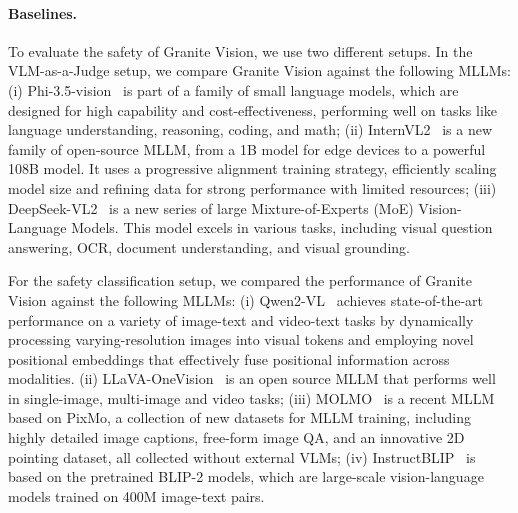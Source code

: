 \paragraph{Baselines.} To evaluate the safety of Granite Vision, we use two different setups. In the VLM-as-a-Judge setup, we compare Granite Vision against the following MLLMs: (i) Phi-3.5-vision~\citep{abdin2024phi} is part of a family of small language models, which are designed for high capability and cost-effectiveness, performing well on tasks like language understanding, reasoning, coding, and math; (ii) InternVL2~\citep{chen2024internvl} is a new family of open-source MLLM, from a 1B model for edge devices to a powerful 108B model. It uses a progressive alignment training strategy, efficiently scaling model size and refining data for strong performance with limited resources; (iii) DeepSeek-VL2~\citep{wu2024deepseekvl2} is a new series of large Mixture-of-Experts (MoE) Vision-Language Models. This model excels in various tasks, including visual question answering, OCR, document understanding, and visual grounding.



For the safety classification setup, we compared the performance of Granite Vision against the following MLLMs: (i) Qwen2-VL~\citep{wang2024qwen2} achieves state-of-the-art performance on a variety of image-text and video-text tasks by dynamically processing varying-resolution images into visual tokens and employing novel positional embeddings that effectively fuse positional information across modalities. (ii) LLaVA-OneVision~\citep{Li2024LLaVAOneVisionEV} is an open source MLLM that performs well in single-image, multi-image and video tasks;  (iii) MOLMO~\citep{molmo} is a recent MLLM based on PixMo, a collection of new datasets for MLLM training, including highly detailed image captions, free-form image QA, and an innovative 2D pointing dataset, all collected without external VLMs; (iv) InstructBLIP~\citep{dai2023instructblip} is based on the pretrained BLIP-2 models, which are large-scale vision-language models trained on 400M image-text pairs.






